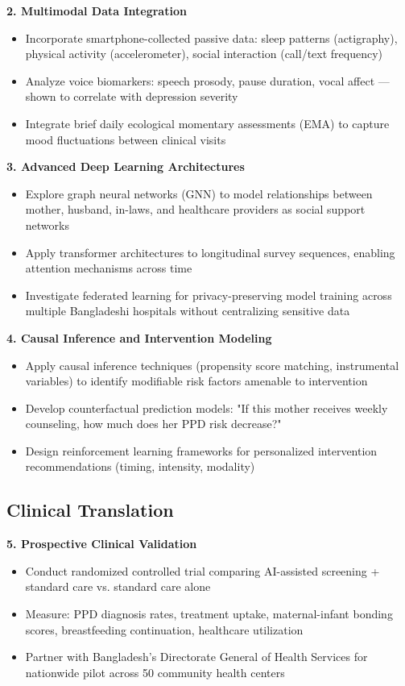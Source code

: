 \textbf{2. Multimodal Data Integration}
\begin{itemize}
    \item Incorporate smartphone-collected passive data: sleep patterns (actigraphy), physical activity (accelerometer), social interaction (call/text frequency)
    \item Analyze voice biomarkers: speech prosody, pause duration, vocal affect — shown to correlate with depression severity
    \item Integrate brief daily ecological momentary assessments (EMA) to capture mood fluctuations between clinical visits
\end{itemize}

\textbf{3. Advanced Deep Learning Architectures}
\begin{itemize}
    \item Explore graph neural networks (GNN) to model relationships between mother, husband, in-laws, and healthcare providers as social support networks
    \item Apply transformer architectures to longitudinal survey sequences, enabling attention mechanisms across time
    \item Investigate federated learning for privacy-preserving model training across multiple Bangladeshi hospitals without centralizing sensitive data
\end{itemize}

\textbf{4. Causal Inference and Intervention Modeling}
\begin{itemize}
    \item Apply causal inference techniques (propensity score matching, instrumental variables) to identify modifiable risk factors amenable to intervention
    \item Develop counterfactual prediction models: "If this mother receives weekly counseling, how much does her PPD risk decrease?"
    \item Design reinforcement learning frameworks for personalized intervention recommendations (timing, intensity, modality)
\end{itemize}

\subsection{Clinical Translation}

\textbf{5. Prospective Clinical Validation}
\begin{itemize}
    \item Conduct randomized controlled trial comparing AI-assisted screening + standard care vs. standard care alone
    \item Measure: PPD diagnosis rates, treatment uptake, maternal-infant bonding scores, breastfeeding continuation, healthcare utilization
    \item Partner with Bangladesh's Directorate General of Health Services for nationwide pilot across 50 community health centers
\end{itemize}

